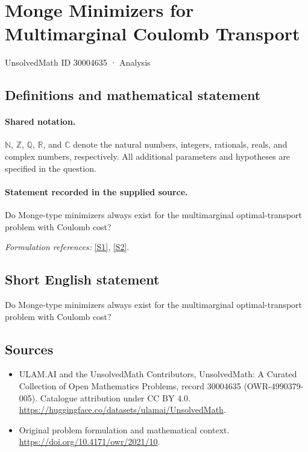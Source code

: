 \documentclass[11pt]{article}
\newcommand{\sref}[2]{\hyperlink{source:#1:#2}{[S#2]}}
\begin{document}
\setcounter{section}{30004634}
\section{Monge Minimizers for Multimarginal Coulomb Transport}\label{30004635}
{\small UnsolvedMath ID 30004635 · Analysis}
\subsection{Definitions and mathematical statement}

\paragraph{Shared notation.}$\mathbb N$, $\mathbb Z$, $\mathbb Q$, $\mathbb R$, and $\mathbb C$ denote the natural numbers, integers, rationals, reals, and complex numbers, respectively. All additional parameters and hypotheses are specified in the question.


\paragraph{Statement recorded in the supplied source.}
Do Monge-type minimizers always exist for the multimarginal optimal-transport problem with Coulomb cost?
\par\smallskip\textit{Formulation references:} \sref{30004635}{1}, \sref{30004635}{2}.
\subsection{Short English statement}
Do Monge-type minimizers always exist for the multimarginal optimal-transport problem with Coulomb cost?
\subsection{Sources}
\begin{itemize}
\item[\hypertarget{source:30004635:1}{S1}] ULAM.AI and the UnsolvedMath Contributors, UnsolvedMath: A Curated Collection of Open Mathematics Problems, record 30004635 (OWR-4990379-005). Catalogue attribution under CC BY 4.0.
\url{https://huggingface.co/datasets/ulamai/UnsolvedMath}.
\item[\hypertarget{source:30004635:2}{S2}] Original problem formulation and mathematical context.
\url{https://doi.org/10.4171/owr/2021/10}.
\end{itemize}
\label{end:30004635}
\end{document}
